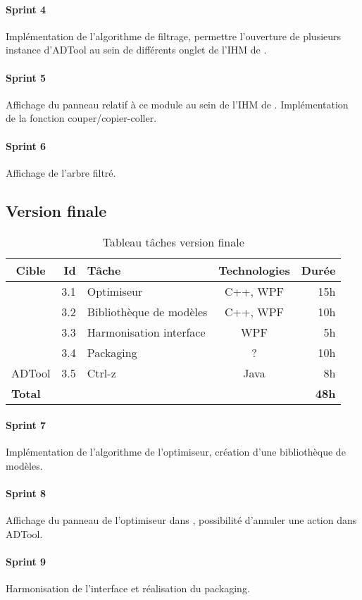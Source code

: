 		\paragraph{Sprint 4} Implémentation de l'algorithme de filtrage, permettre l'ouverture de plusieurs instance d'ADTool au sein de différents onglet de l'IHM de \glasir{}. 
		\paragraph{Sprint 5} Affichage du panneau relatif à ce module au sein de l'IHM de \glasir{}. Implémentation de la fonction couper/copier-coller. %
		\paragraph{Sprint 6} Affichage de l'arbre filtré.

	\subsection{Version finale}

		\begin{table}[h]
			\centering
			\begin{tabular}{|c|r|l|c|r|}
				\hline
				\textbf{Cible} & \textbf{Id} & \textbf{Tâche} & \textbf{Technologies} & \textbf{Durée}\\
				\hline

				\multirow{4}{*}{\glasir{}} & 3.1 & Optimiseur & C++, WPF & 15h\\
				\cline{2-5}
				 & 3.2 & Bibliothèque de modèles & C++, WPF & 10h\\
				\cline{2-5}
				 & 3.3 & Harmonisation interface & WPF & 5h\\
				\cline{2-5}
				 & 3.4 & Packaging & ? & 10h\\
				\hline

				\multirow{1}{*}{ADTool} & 3.5 & Ctrl-z & \multirow{1}{*}{Java} & 8h\\
				\hline

				\multicolumn{4}{|l|}{\bf Total} & {\bf 48h}\\
				\hline
			\end{tabular}
			\caption{Tableau tâches version finale}
			\label{fig:taches_units_3}
		\end{table}

		\paragraph{Sprint 7} Implémentation de l'algorithme de l'optimiseur, création d'une bibliothèque de modèles. 
		\paragraph{Sprint 8} Affichage du panneau de l'optimiseur dans \glasir{}, possibilité d'annuler une action dans ADTool. 
		\paragraph{Sprint 9} Harmonisation de l'interface et réalisation du packaging.
